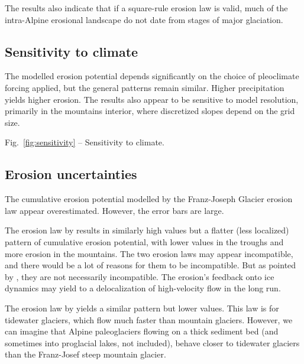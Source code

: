 \documentclass[utf8]{article}
\begin{document}
    The results also indicate that if a square-rule erosion law is valid, much
    of the intra-Alpine erosional landscape do not date from stages of major
    glaciation.

\subsection{Sensitivity to climate}

    The modelled erosion potential depends significantly on the choice of
    pleoclimate forcing applied, but the general patterns remain similar.
    Higher precipitation yields higher erosion. The results also appear to be
    sensitive to model resolution, primarily in the mountains interior, where
    discretized slopes depend on the grid size.

    Fig.~\ref{fig:sensitivity} -- Sensitivity to climate.

\subsection{Erosion uncertainties}

    The cumulative erosion potential modelled by the Franz-Joseph Glacier
    erosion law \citep{Herman.etal.2015} appear overestimated. However, the
    error bars are large.

    The erosion law by \citet{Cook.etal.2020} results in similarly high values
    but a flatter (less localized) pattern of cumulative erosion potential,
    with lower values in the troughs and more erosion in the mountains. The two
    erosion laws may appear incompatible, and there would be a lot of reasons
    for them to be incompatible. But as pointed by \citet{Cook.etal.2020}, they
    are not necessarily incompatible. The erosion's feedback onto ice dynamics
    may yield to a delocalization of high-velocity flow in the long run.

    The erosion law by \citet{Koppes.etal.2015} yields a similar pattern but
    lower values. This law is for tidewater glaciers, which flow much faster
    than mountain glaciers. However, we can imagine that Alpine paleoglaciers
    flowing on a thick sediment bed (and sometimes into proglacial lakes, not
    included), behave closer to tidewater glaciers than the Franz-Josef steep
    mountain glacier.
\end{document}
